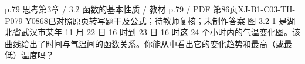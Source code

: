 \par\noindent\begin{minipage}{\linewidth}
\begin{bankitem}{p.79 思考}{第3章 / 3.2 函数的基本性质 / 教材 p.79 / PDF 第86页}{XJ-B1-C03-TH-P079-Y0868}{已对照原页转写题干及公式；待教师复核；未制作答案}
图 3.2-1 是湖北省武汉市某年 11 月 22 日 16 时到 23 日 16 时这 24 个小时内的气温变化图。该曲线给出了时间与气温间的函数关系。你能从中看出它的变化趋势和最高（或最低）温度吗？
\end{bankitem}
\end{minipage}\par\medskip
